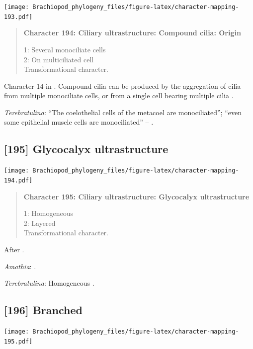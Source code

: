 \documentclass[openany]{book}
\begin{document}
\texttt{[image: Brachiopod\_phylogeny\_files/figure-latex/character-mapping-193.pdf]}

\begin{quote}
\textbf{Character 194: Ciliary ultrastructure: Compound cilia: Origin}

1: Several monociliate cells\\
2: On multiciliated cell\\
Transformational character.
\end{quote}

Character 14 in \citet{Glenner2004}. Compound cilia can be produced by
the aggregation of cilia from multiple monociliate cells, or from a
single cell bearing multiple cilia \citep{Nielsen1987}.

\hypertarget{Terebratulina-coding-194}{}
\emph{Terebratulina}: ``The coelothelial cells of the metacoel are
monociliated''; ``even some epithelial muscle cells are monociliated''
-- \citet{Luter1995}.

\subsection*{{[}195{]} Glycocalyx
ultrastructure}\label{glycocalyx-ultrastructure}

\texttt{[image: Brachiopod\_phylogeny\_files/figure-latex/character-mapping-194.pdf]}

\begin{quote}
\textbf{Character 195: Ciliary ultrastructure: Glycocalyx
ultrastructure}

1: Homogeneous\\
2: Layered\\
Transformational character.
\end{quote}

After \citet{Lundin2009}.

\hypertarget{Amathia-coding-195}{}
\emph{Amathia}: \citet{Reed1982}.

\hypertarget{Terebratulina-coding-195}{}
\emph{Terebratulina}: Homogeneous \citep{Luter1995}.

\subsection*{{[}196{]} Branched}\label{branched}

\texttt{[image: Brachiopod\_phylogeny\_files/figure-latex/character-mapping-195.pdf]}
\end{document}
